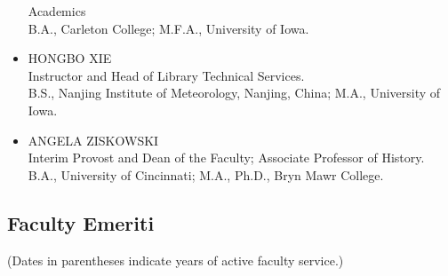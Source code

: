 \documentclass[
  letterpaper,
]{scrbook}
\begin{document}
\begin{itemize}
  Academics\\
  B.A., Carleton College; M.F.A., University of Iowa.
\item
  HONGBO XIE\\
  Instructor and Head of Library Technical Services.\\
  B.S., Nanjing Institute of Meteorology, Nanjing, China; M.A.,
  University of Iowa.
\item
  ANGELA ZISKOWSKI\\
  Interim Provost and Dean of the Faculty; Associate Professor of
  History.\\
  B.A., University of Cincinnati; M.A., Ph.D., Bryn Mawr College.
\end{itemize}

\subsection{Faculty Emeriti}\label{faculty-emeriti}

(Dates in parentheses indicate years of active faculty service.)
\end{document}
